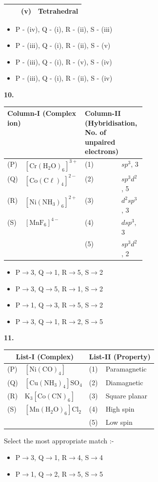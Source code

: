 \documentclass[10pt]{extarticle}
\newcommand{\qn}[1]{\par\smallskip\noindent\textbf{#1.}~}
\newenvironment{qoptions}{\begin{itemize}[leftmargin=1.8em,itemsep=1pt,topsep=2pt,label={}]}{\end{itemize}}
\newcommand{\opt}[2]{\item[(#1)] #2}
\begin{document}
\begin{multicols}{2}
{\begin{tabular}{|l|l|l|l|}
 & & (v) & Tetrahedral\\ \hline
\end{tabular}}
\begin{qoptions}
\opt{A}{P - (iv), Q - (i), R - (ii), S - (iii)}
\opt{B}{P - (iii), Q - (i), R - (ii), S - (v)}
\opt{C}{P - (iii), Q - (i), R - (v), S - (iv)}
\opt{D}{P - (iii), Q - (i), R - (ii), S - (iv)}
\end{qoptions}
\qn{10} {\footnotesize\setlength{\tabcolsep}{3pt}\begin{tabular}{|l|l|l|p{0.33\linewidth}|}
\hline
\multicolumn{2}{|p{0.3\linewidth}|}{\textbf{Column-I (Complex ion)}} & \multicolumn{2}{p{0.4\linewidth}|}{\textbf{Column-II (Hybridisation, No. of unpaired electrons)}}\\ \hline
(P) & $\mathrm{[Cr(H_2O)_6]^{3+}}$ & (1) & $sp^3$, 3\\ \hline
(Q) & $\mathrm{[Co(C\ell)_4]^{2-}}$ & (2) & $sp^3d^2$, 5\\ \hline
(R) & $\mathrm{[Ni(NH_3)_6]^{2+}}$ & (3) & $d^2sp^3$, 3\\ \hline
(S) & $\mathrm{[MnF_6]^{4-}}$ & (4) & $dsp^3$, 3\\ \hline
 & & (5) & $sp^3d^2$, 2\\ \hline
\end{tabular}}
\begin{qoptions}
\opt{A}{P$\to$3, Q$\to$1, R$\to$5, S$\to$2}
\opt{B}{P$\to$3, Q$\to$5, R$\to$1, S$\to$2}
\opt{C}{P$\to$1, Q$\to$3, R$\to$5, S$\to$2}
\opt{D}{P$\to$3, Q$\to$1, R$\to$2, S$\to$5}
\end{qoptions}
\qn{11} {\footnotesize\setlength{\tabcolsep}{3pt}\begin{tabular}{|l|l|l|l|}
\hline
\multicolumn{2}{|c|}{\textbf{List-I (Complex)}} & \multicolumn{2}{c|}{\textbf{List-II (Property)}}\\ \hline
(P) & $\mathrm{[Ni(CO)_4]}$ & (1) & Paramagnetic\\ \hline
(Q) & $\mathrm{[Cu(NH_3)_4]SO_4}$ & (2) & Diamagnetic\\ \hline
(R) & $\mathrm{K_3[Co(CN)_6]}$ & (3) & Square planar\\ \hline
(S) & $\mathrm{[Mn(H_2O)_6]Cl_2}$ & (4) & High spin\\ \hline
 & & (5) & Low spin\\ \hline
\end{tabular}}\par
Select the most appropriate match :-
\begin{qoptions}
\opt{A}{P$\to$3, Q$\to$1, R$\to$4, S$\to$4}
\opt{B}{P$\to$1, Q$\to$2, R$\to$5, S$\to$5}

\end{qoptions}
\end{multicols}
\end{document}
